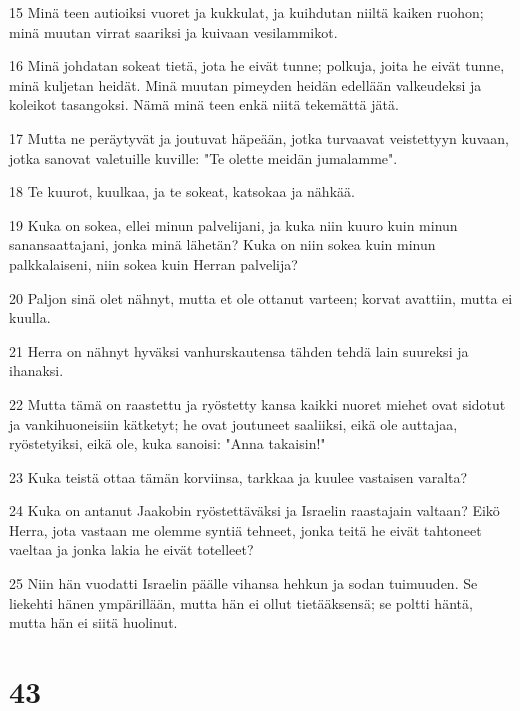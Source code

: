\par 15 Minä teen autioiksi vuoret ja kukkulat, ja kuihdutan niiltä kaiken ruohon; minä muutan virrat saariksi ja kuivaan vesilammikot.
\par 16 Minä johdatan sokeat tietä, jota he eivät tunne; polkuja, joita he eivät tunne, minä kuljetan heidät. Minä muutan pimeyden heidän edellään valkeudeksi ja koleikot tasangoksi. Nämä minä teen enkä niitä tekemättä jätä.
\par 17 Mutta ne peräytyvät ja joutuvat häpeään, jotka turvaavat veistettyyn kuvaan, jotka sanovat valetuille kuville: "Te olette meidän jumalamme".
\par 18 Te kuurot, kuulkaa, ja te sokeat, katsokaa ja nähkää.
\par 19 Kuka on sokea, ellei minun palvelijani, ja kuka niin kuuro kuin minun sanansaattajani, jonka minä lähetän? Kuka on niin sokea kuin minun palkkalaiseni, niin sokea kuin Herran palvelija?
\par 20 Paljon sinä olet nähnyt, mutta et ole ottanut varteen; korvat avattiin, mutta ei kuulla.
\par 21 Herra on nähnyt hyväksi vanhurskautensa tähden tehdä lain suureksi ja ihanaksi.
\par 22 Mutta tämä on raastettu ja ryöstetty kansa kaikki nuoret miehet ovat sidotut ja vankihuoneisiin kätketyt; he ovat joutuneet saaliiksi, eikä ole auttajaa, ryöstetyiksi, eikä ole, kuka sanoisi: "Anna takaisin!"
\par 23 Kuka teistä ottaa tämän korviinsa, tarkkaa ja kuulee vastaisen varalta?
\par 24 Kuka on antanut Jaakobin ryöstettäväksi ja Israelin raastajain valtaan? Eikö Herra, jota vastaan me olemme syntiä tehneet, jonka teitä he eivät tahtoneet vaeltaa ja jonka lakia he eivät totelleet?
\par 25 Niin hän vuodatti Israelin päälle vihansa hehkun ja sodan tuimuuden. Se liekehti hänen ympärillään, mutta hän ei ollut tietääksensä; se poltti häntä, mutta hän ei siitä huolinut.

\chapter{43}

